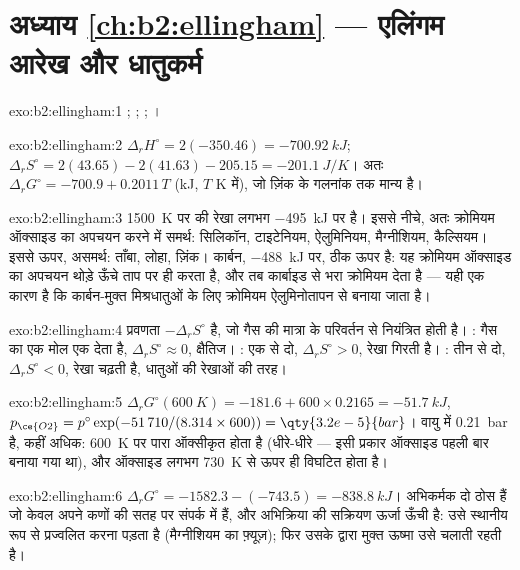 \section*{अध्याय \ref{ch:b2:ellingham} --- एलिंगम आरेख और धातुकर्म}

\begin{solution}{exo:b2:ellingham:1}
; ; ;
।
\end{solution}

\begin{solution}{exo:b2:ellingham:2}
$\Delta_r H^\circ = 2(-350.46) = \qty{-700.92}{kJ}$; $\Delta_r S^\circ = 2(43.65)
- 2(41.63) - 205.15 = \qty{-201.1}{J/K}$। अतः $\Delta_r G^\circ = -700.9 +
0.2011\,T$ (\unit{kJ}, $T$ \unit{K} में), जो ज़िंक के गलनांक तक मान्य है।
\end{solution}

\begin{solution}{exo:b2:ellingham:3}
\qty{1500}{K} पर  की रेखा लगभग \qty{-495}{kJ} पर है। इससे नीचे, अतः
क्रोमियम ऑक्साइड का अपचयन करने में समर्थ: सिलिकॉन, टाइटेनियम, ऐलुमिनियम, मैग्नीशियम,
कैल्सियम। इससे ऊपर, असमर्थ: ताँबा, लोहा, ज़िंक। कार्बन, \qty{-488}{kJ} पर,
ठीक ऊपर है: यह क्रोमियम ऑक्साइड का अपचयन थोड़े ऊँचे ताप पर ही करता है,
और तब कार्बाइड से भरा क्रोमियम देता है --- यही एक कारण है कि
कार्बन-मुक्त मिश्रधातुओं के लिए क्रोमियम ऐलुमिनोतापन से बनाया जाता है।
\end{solution}

\begin{solution}{exo:b2:ellingham:4}
प्रवणता $-\Delta_r S^\circ$ है, जो गैस की मात्रा के परिवर्तन से नियंत्रित होती है।
: गैस का एक मोल एक देता है, $\Delta_r S^\circ \approx 0$,
क्षैतिज। : एक से दो, $\Delta_r S^\circ > 0$,
रेखा गिरती है। : तीन से दो, $\Delta_r S^\circ < 0$,
रेखा चढ़ती है, धातुओं की रेखाओं की तरह।
\end{solution}

\begin{solution}{exo:b2:ellingham:5}
$\Delta_r G^\circ(\qty{600}{K}) = -181.6 + 600 \times 0.2165 = \qty{-51.7}{kJ}$,
$p_{\ce{O2}} = p^\circ\exp(-51\,710/(8.314 \times 600)) = \qty{3.2e-5}{bar}$। वायु में
\qty{0.21}{bar} है, कहीं अधिक: \qty{600}{K} पर पारा ऑक्सीकृत होता है (धीरे-धीरे
--- इसी प्रकार ऑक्साइड पहली बार बनाया गया था), और ऑक्साइड लगभग
\qty{730}{K} से ऊपर ही विघटित होता है।
\end{solution}

\begin{solution}{exo:b2:ellingham:6}
$\Delta_r G^\circ = -1582.3 - (-743.5) = \qty{-838.8}{kJ}$। अभिकर्मक
दो ठोस हैं जो केवल अपने कणों की सतह पर संपर्क में हैं, और अभिक्रिया की
सक्रियण ऊर्जा ऊँची है: उसे स्थानीय रूप से प्रज्वलित करना पड़ता है (मैग्नीशियम का फ़्यूज़);
फिर उसके द्वारा मुक्त ऊष्मा उसे चलाती रहती है।
\end{solution}

